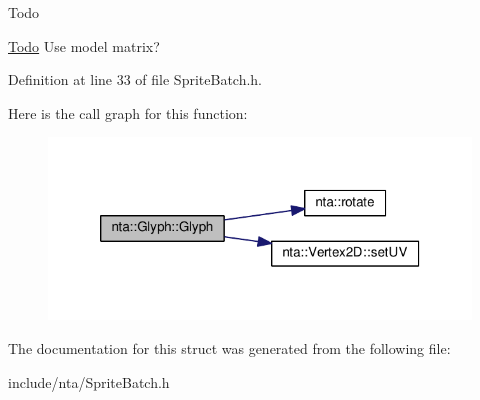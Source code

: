 \begin{DoxyRefDesc}{Todo}
\item[\hyperlink{todo__todo000007}{Todo}]Use model matrix? \end{DoxyRefDesc}


Definition at line 33 of file Sprite\+Batch.\+h.

Here is the call graph for this function\+:\nopagebreak
\begin{figure}[H]
\begin{center}
\leavevmode
\includegraphics[width=320pt]{d6/db3/structnta_1_1Glyph_a3b2afa4370140736d9d1b28de20d2105_cgraph}
\end{center}
\end{figure}


The documentation for this struct was generated from the following file\+:\begin{DoxyCompactItemize}
\item 
include/nta/Sprite\+Batch.\+h\end{DoxyCompactItemize}

